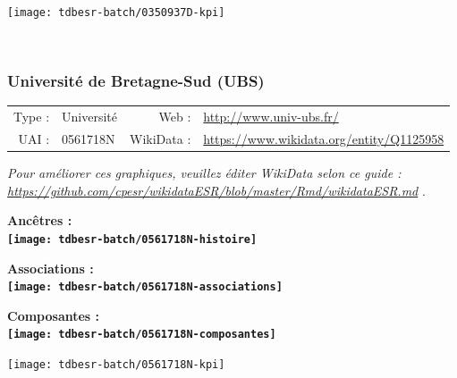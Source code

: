 \documentclass[12pt,french,]{article}
\begin{document}
\begin{center}\texttt{[image: tdbesr-batch/0350937D-kpi]} \end{center}\checkoddpage

\ifoddpage \fi ~\newpage  

\hypertarget{universituxe9-de-bretagne-sud-ubs}{%
\subsubsection{Université de Bretagne-Sud
(UBS)}\label{universituxe9-de-bretagne-sud-ubs}}

\begin{tabular*}{\textwidth}{rp{5cm}rl}  
\hline  
Type : & Université & Web : &\href{http://www.univ-ubs.fr/}{http://www.univ-ubs.fr/} \\  
UAI : & 0561718N & WikiData : & \href{https://www.wikidata.org/entity/Q1125958}{https://www.wikidata.org/entity/Q1125958} \\  
\hline  
\end{tabular*}

\textit{\scriptsize Pour améliorer ces graphiques, veuillez éditer WikiData selon ce guide :  \href{https://github.com/cpesr/wikidataESR/blob/master/Rmd/wikidataESR.md}{https://github.com/cpesr/wikidataESR/blob/master/Rmd/wikidataESR.md}}
.

\vspace{1cm}  
\begin{minipage}[b]{0.50\textwidth}\begin{center} \bf Ancêtres : \\  
\texttt{[image: tdbesr-batch/0561718N-histoire]} \end{center}\end{minipage}\begin{minipage}[b]{0.50\textwidth}\begin{center} \bf Associations : \\  
\texttt{[image: tdbesr-batch/0561718N-associations]} \end{center}\end{minipage}

\hrulefill

\begin{center} \bf Composantes : \\  
\texttt{[image: tdbesr-batch/0561718N-composantes]} \end{center}

\begin{center}\texttt{[image: tdbesr-batch/0561718N-kpi]} \end{center}\checkoddpage
\end{document}
